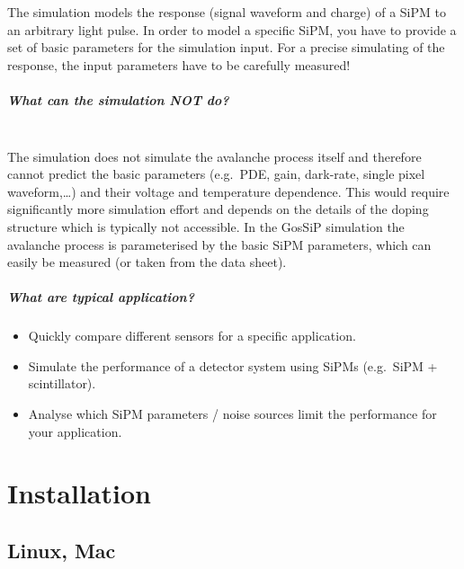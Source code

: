 The simulation models the response (signal waveform and charge) of a SiPM to an arbitrary light pulse.
In order to model a specific SiPM, you have to provide a set of basic parameters for the simulation input.
For a precise simulating of the response, the input parameters have to be carefully measured!

\paragraph{What can the simulation NOT do?}\mbox{}\\

The simulation does not simulate the avalanche process itself and therefore cannot predict the basic parameters (e.g.\ PDE, gain, dark-rate, single pixel waveform,\dots) and their voltage and temperature dependence. This would require significantly more simulation effort and depends on the details of the doping structure which is typically not accessible.
In the GosSiP simulation the avalanche process is parameterised by the basic SiPM parameters, which can easily be measured (or taken from the data sheet).

\paragraph{What are typical application?}

\begin{itemize}
	\item Quickly compare different sensors for a specific application.
	\item Simulate the performance of a detector system using SiPMs (e.g.\ SiPM + scintillator).
	\item Analyse which SiPM parameters / noise sources limit the performance for your application.
\end{itemize}



\chapter{Installation}

\section{Linux, Mac}

